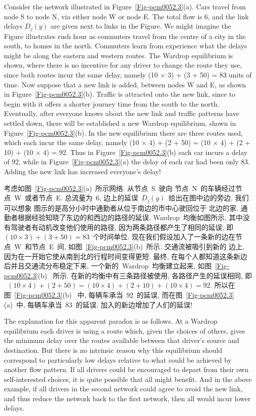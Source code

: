 \documentclass[a4paper,12pt, twocolumn]{article}
\begin{document}
Consider the network illustrated in 
Figure~\ref{Fig-pcm0052.3}(a). Cars travel 
from node S to node N, via either node W or node E. The total flow is 6, 
and the link delays $D_j(y)$ are given next to links in the
Figure. We might imagine the Figure illustrates 
rush hour as commuters travel from the centre of 
a city in the south, to homes in the north. Commuters 
learn from experience what the delays might be along the eastern
and western routes. The Wardrop equilibrium is shown,
where there is no incentive for any driver to change the route
they use, since both routes incur the same delay,
namely (10 $\times$ 3) + (3 + 50) = 83 units of time.
Now suppose that a new link
is added, between nodes W and E, as shown in 
Figure~\ref{Fig-pcm0052.3}(b). Traffic is
attracted onto the new link, since to begin with it 
offers a shorter journey time from the south to the north.
Eventually, after everyone knows about the new link
and traffic patterns have settled down, there will
be established a new Wardrop equilibrium, shown
in Figure~\ref{Fig-pcm0052.3}(b). In the new equilibrium
there are three routes used, which each incur the same delay,
namely (10 $\times$ 4) + (2 + 50) = 
(10 $\times$ 4) + (2 + 10) + (10 $\times$ 4) = 92. 
Thus in Figure~\ref{Fig-pcm0052.3}(b) 
each car incurs a delay of 92, 
while in Figure~\ref{Fig-pcm0052.3}(a) the delay of
each car had been only 83.
Adding the new link has increased everyone's delay!

考虑如图~\ref{Fig-pcm0052.3}(a)~所示网络. 从节点~S~驶向
节点~N~的车辆经过节点~W~或者节点~E. 总流量为~6, 
边上的延误~$D_{j}(y)$~给出在图中边的旁边. 我们可以想象
图示的是高分小时中通勤者从位于南边的市中心驶回位于
北边的家. 通勤者根据经验知晓了东边的和西边的路径的延误. 
Wardrop~均衡如图所示, 其中没有驾驶者有动机改变他们使用的路径, 
因为两条路径都产生了相同的延误, 即
~$(10 \times 3) + (3 + 50) = 83$~个时间单位. 
现在我们假设加入了一条新的边在节点~W~和节点~E~间, 
如图~\ref{Fig-pcm0052.3}(b)~所示. 交通流被吸引到新的
边上, 因为在一开始它使从南到北的行程时间变得更短. 
最终, 在每个人都知道这条新边后并且交通流分布稳定下来, 
一个新的~Wardrop~均衡建立起来, 如图~\ref{Fig-pcm0052.3}(b)~
所示. 在新的均衡中有三条路径被使用, 各路径产生的延误相同, 即
~$(10 \times 4) + (2 + 50) = (10 \times 4) + (2 + 10) + (10 \times 4) = 92$. 
所以在图~\ref{Fig-pcm0052.3}(b) ~中, 每辆车承当~92~的延误, 
而在图~\ref{Fig-pcm0052.3}(a)~中, 每辆车承当~83~的延误. 
加入的新边增加了人们的延误! 

The explanation for this apparent paradox is as follows.
At a Wardrop equilibrium each driver is 
using a route which, given the choices of others,
gives the minimum delay over the routes 
available between that driver's 
source and destination. But there is no intrinsic reason
why this equilibrium should correspond to particularly low
delays relative to what could be achieved by another
flow pattern.
If all drivers could be
encouraged to depart from their own self-interested choices,
it is quite possible that all might benefit. And in the above example,
if all drivers in the second network could agree to 
avoid the new link, and thus reduce the network
back to the first network, then all would incur lower delays.
\end{document}
